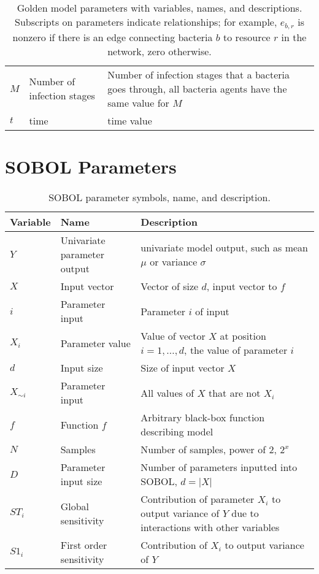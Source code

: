 \begin{table}[h!]
\begin{tabularx}{\textwidth}{l l X}
        $M$ & Number of infection stages & Number of infection stages that a bacteria goes through, all bacteria agents have the same value for $M$\\
        $t$ & time & time value \\
        \bottomrule
    \end{tabularx}\newline
    \caption{
        Golden model parameters with variables, names, and descriptions. 
        Subscripts on parameters indicate relationships; for example, $e_{b, r}$ is nonzero if there is an edge connecting bacteria $b$ to resource $r$ in the network, zero otherwise.
    }
    \label{tab:parameter_table_simple_golden_model}
\end{table}


\section{SOBOL Parameters}
\begin{table}[h!]
    \small %
    \centering
    \begin{tabularx}{\textwidth}{l l X}
        \toprule
        \textbf{Variable} & \textbf{Name} & \textbf{Description} \\
        \midrule
        $Y$ & Univariate parameter output & univariate model output, such as mean $\mu$ or variance $\sigma$ \\
        $X$ & Input vector & Vector of size $d$, input vector to $f$ \\
        $i$ & Parameter input & Parameter $i$ of input \\
        $X_i$ & Parameter value & Value of vector $X$ at position $i=1, \dots, d$, the value of parameter $i$ \\
        $d$ & Input size & Size of input vector $X$ \\
        $X_{\sim i}$ & Parameter input & All values of $X$ that are not $X_i$ \\
        $f$ & Function $f$ & Arbitrary black-box function describing model \\
        $N$ & Samples & Number of samples, power of 2, $2^x$ \\
        $D$ & Parameter input size & Number of parameters inputted into SOBOL, $d=|X|$ \\
        $ST_i$ & Global sensitivity & Contribution of parameter $X_i$ to output variance of $Y$ due to interactions with other variables \\
        $S1_i$ & First order sensitivity & Contribution of $X_i$ to output variance of $Y$ \\
        \bottomrule
    \end{tabularx} \newline
    \caption{
        SOBOL parameter symbols, name, and description.
    }
    \label{tab:parameter_table_SOBOL}
\end{table}


